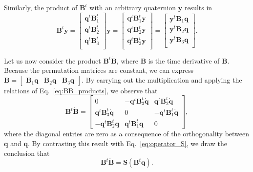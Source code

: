 \documentclass[aip,jcp,reprint,amsmath,amssymb,raggedbottom]{revtex4-1}
\newcommand{\mt}[1]{\boldsymbol{\mathbf{#1}}}           %
\newcommand{\vt}[1]{\boldsymbol{\mathbf{#1}}}           %
\newcommand{\tr}[1]{#1^t}                               %
\begin{document}
Similarly, the product of $\tr{\mt B}$ with an arbitrary quaternion $\vt y$ results in
\begin{equation}
\label{eq:vector_entries}
\tr{\mt B}\vt y =
\left[\begin{array}{c}
\tr{\vt q}\tr{\mt B}_1 \\
\tr{\vt q}\tr{\mt B}_2 \\
\tr{\vt q}\tr{\mt B}_3 \\
\end{array}\right]\vt y = 
\left[\begin{array}{c}
\tr{\vt q}\tr{\mt B}_1\vt y \\
\tr{\vt q}\tr{\mt B}_2\vt y \\
\tr{\vt q}\tr{\mt B}_3\vt y \\
\end{array}\right] = 
\left[\begin{array}{c}
\tr{\vt y}{\mt B}_1\vt q \\
\tr{\vt y}{\mt B}_2\vt q \\
\tr{\vt y}{\mt B}_3\vt q \\
\end{array}\right].
\end{equation}

Let us now consider the product $\tr{\mt B}\dot{\mt B}$, where $\dot{\mt B}$ is the time derivative of $\mt B$. Because the permutation matrices are constant, we can express $\dot{\mt B} = [\begin{array}{ccc}{\mt B}_1\dot{\vt q} & {\mt B}_2\dot{\vt q} & {\mt B}_3\dot{\vt q}\end{array}]$. By carrying out the multiplication and applying the relations of Eq.~\ref{eq:BB_products}, we observe that
\[
\tr{\mt B}\dot{\mt B} = \left[
\begin{array}{ccc}
0 & -\tr{\vt q} \tr{\mt B_3}\dot{\vt q} & \tr{\vt q} \tr{\mt B_2}\dot{\vt q} \\
\tr{\vt q} \tr{\mt B_3}\dot{\vt q} & 0 & -\tr{\vt q} \tr{\mt B_1}\dot{\vt q} \\
-\tr{\vt q} \tr{\mt B_2}\dot{\vt q} & \tr{\vt q} \tr{\mt B_1}\dot{\vt q}  & 0
\end{array}
\right],
\]
where the diagonal entries are zero as a consequence of the orthogonality between $\vt q$ and $\dot{\vt q}$. By contrasting this result with Eq.~\ref{eq:operator_S}, we draw the conclusion that
\begin{equation}
\label{eq:relation_B_qdot}
\tr{\mt B}\dot{\mt B} = {\mt S}\left( \tr{\mt B}\dot{\vt q} \right).
\end{equation}
\end{document}

